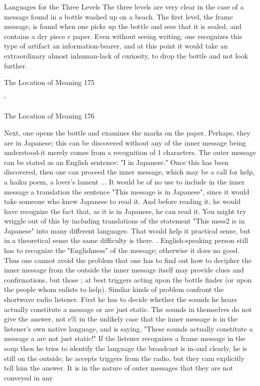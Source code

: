                            Languages for the Three Levels
The three levels are very clear in the case of a message found in a bottle washed up on a
beach. The first level, the frame message, is found when one picks up the bottle and sees
that it is sealed, and contains a dry piece c paper. Even without seeing writing, one
recognizes this type of artifact an information-bearer, and at this point it would take an
extraordinary almost inhuman-lack of curiosity, to drop the bottle and not look further.




The Location of Meaning                                                                       175

                          '




The Location of Meaning       176

Next, one opens the bottle and examines the marks on the paper. Perhaps, they are in
Japanese; this can be discovered without any of the inner message being understood-it
merely comes from a recognition of 1 characters. The outer message can be stated as an
English sentence: "I in Japanese." Once this has been discovered, then one can proceed
the inner message, which may be a call for help, a haiku poem, a lover’s lament ...
         It would be of no use to include in the inner message a translation the sentence
"This message is in Japanese", since it would take someone who knew Japanese to read
it. And before reading it, he would have recognize the fact that, as it is in Japanese, he
can read it. You might try wriggle out of this by including translations of the statement
"This mess2 is in Japanese" into many different languages. That would help it practical
sense, but in a theoretical sense the same difficulty is there. . English-speaking person
still has to recognize the "Englishness" of the message; otherwise it does no good. Thus
one cannot avoid the problem that one has to find out how to decipher the inner message
from the outside the inner message itself may provide clues and confirmations, but those ;
at best triggers acting upon the bottle finder (or upon the people whom enlists to help).
         Similar kinds of problem confront the shortwave radio listener. First he has to
decide whether the sounds he hears actually constitute a message or are just static. The
sounds in themselves do not give the answer, not e\% in the unlikely case that the inner
message is in the listener's own native language, and is saying, "These sounds actually
constitute a message a are not just static!" If the listener recognizes a frame message in
the soup then he tries to identify the language the broadcast is in-and clearly, he is still on
the outside; he accepts triggers from the radio, but they cam explicitly tell him the
answer.
         It is in the nature of outer messages that they are not conveyed in any

